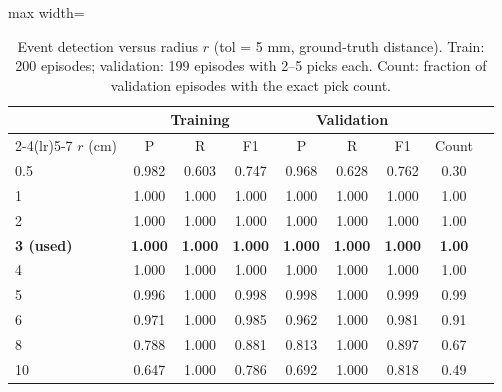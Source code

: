 \begin{table}[t]
\centering
\caption{Event detection versus radius $r$ (tol = 5 mm, ground-truth distance). Train: 200 episodes; validation: 199 episodes with 2--5 picks each. Count: fraction of validation episodes with the exact pick count.}
\label{tab:radius}
\small
\begin{adjustbox}{max width=\textwidth}\begin{tabular}{lcccccccc}
\toprule
 & \multicolumn{3}{c}{Training} & \multicolumn{3}{c}{Validation} & \\
\cmidrule(lr){2-4}\cmidrule(lr){5-7}
$r$ (cm) & P & R & F1 & P & R & F1 & Count\\
\midrule
0.5 & 0.982 & 0.603 & 0.747 & 0.968 & 0.628 & 0.762 & 0.30\\
1 & 1.000 & 1.000 & 1.000 & 1.000 & 1.000 & 1.000 & 1.00\\
2 & 1.000 & 1.000 & 1.000 & 1.000 & 1.000 & 1.000 & 1.00\\
\textbf{3 (used)} & \textbf{1.000} & \textbf{1.000} & \textbf{1.000} & \textbf{1.000} & \textbf{1.000} & \textbf{1.000} & \textbf{1.00}\\
4 & 1.000 & 1.000 & 1.000 & 1.000 & 1.000 & 1.000 & 1.00\\
5 & 0.996 & 1.000 & 0.998 & 0.998 & 1.000 & 0.999 & 0.99\\
6 & 0.971 & 1.000 & 0.985 & 0.962 & 1.000 & 0.981 & 0.91\\
8 & 0.788 & 1.000 & 0.881 & 0.813 & 1.000 & 0.897 & 0.67\\
10 & 0.647 & 1.000 & 0.786 & 0.692 & 1.000 & 0.818 & 0.49\\
\bottomrule
\end{tabular}\end{adjustbox}
\end{table}

